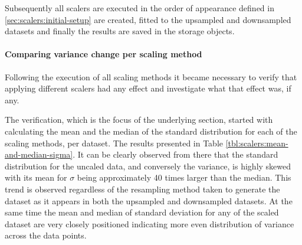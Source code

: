 Subsequently all scalers are executed in the order of appearance defined in \ref{sec:scalers:initial-setup} are created, fitted to the upsampled and downsampled datasets and finally the results are saved in the storage objects.

\paragraph{Comparing variance change per scaling method}
Following the execution of all scaling methods it became necessary to verify that applying different scalers had any effect and investigate what that effect was, if any.

The verification, which is the focus of the underlying section, started with calculating the mean and the median of the standard distribution for each of the scaling methods, per dataset. The results presented in Table \ref{tbl:scalers:mean-and-median-sigma}. It can be clearly observed from there that the standard distribution for  the uncaled data, and conversely the variance, is highly skewed with its mean for $\sigma$ being approximately 40 times larger than the median. This trend is observed regardless of the resampling method taken to generate the dataset as it appears in both the upsampled and downsampled datasets. At the same time the mean and median of standard deviation for any of the scaled dataset are very closely positioned indicating more even distribution of variance across the data points.

